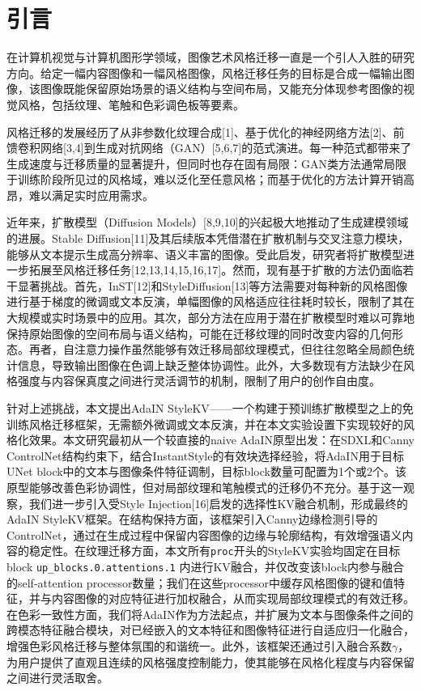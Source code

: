 \documentclass[10pt,twocolumn]{article}
\begin{document}
\section{引言}

在计算机视觉与计算机图形学领域，图像艺术风格迁移一直是一个引人入胜的研究方向。给定一幅内容图像和一幅风格图像，风格迁移任务的目标是合成一幅输出图像，该图像既能保留原始场景的语义结构与空间布局，又能充分体现参考图像的视觉风格，包括纹理、笔触和色彩调色板等要素。

风格迁移的发展经历了从非参数化纹理合成[1]、基于优化的神经网络方法[2]、前馈卷积网络[3,4]到生成对抗网络（GAN）[5,6,7]的范式演进。每一种范式都带来了生成速度与迁移质量的显著提升，但同时也存在固有局限：GAN类方法通常局限于训练阶段所见过的风格域，难以泛化至任意风格；而基于优化的方法计算开销高昂，难以满足实时应用需求。

近年来，扩散模型（Diffusion Models）[8,9,10]的兴起极大地推动了生成建模领域的进展。Stable Diffusion[11]及其后续版本凭借潜在扩散机制与交叉注意力模块，能够从文本提示生成高分辨率、语义丰富的图像。受此启发，研究者将扩散模型进一步拓展至风格迁移任务[12,13,14,15,16,17]。然而，现有基于扩散的方法仍面临若干显著挑战。首先，InST[12]和StyleDiffusion[13]等方法需要对每种新的风格图像进行基于梯度的微调或文本反演，单幅图像的风格适应往往耗时较长，限制了其在大规模或实时场景中的应用。其次，部分方法在应用于潜在扩散模型时难以可靠地保持原始图像的空间布局与语义结构，可能在迁移纹理的同时改变内容的几何形态。再者，自注意力操作虽然能够有效迁移局部纹理模式，但往往忽略全局颜色统计信息，导致输出图像在色调上缺乏整体协调性。此外，大多数现有方法缺少在风格强度与内容保真度之间进行灵活调节的机制，限制了用户的创作自由度。

针对上述挑战，本文提出AdaIN StyleKV——一个构建于预训练扩散模型之上的免训练风格迁移框架，无需额外微调或文本反演，并在本文实验设置下实现较好的风格化效果。本文研究最初从一个较直接的naive AdaIN原型出发：在SDXL和Canny ControlNet结构约束下，结合InstantStyle的有效块选择经验，将AdaIN用于目标UNet block中的文本与图像条件特征调制，目标block数量可配置为1个或2个。该原型能够改善色彩协调性，但对局部纹理和笔触模式的迁移仍不充分。基于这一观察，我们进一步引入受Style Injection[16]启发的选择性KV融合机制，形成最终的AdaIN StyleKV框架。在结构保持方面，该框架引入Canny边缘检测引导的ControlNet，通过在生成过程中保留内容图像的边缘与轮廓结构，有效增强语义内容的稳定性。在纹理迁移方面，本文所有\texttt{proc}开头的StyleKV实验均固定在目标block \texttt{up\_blocks.0.attentions.1} 内进行KV融合，并仅改变该block内参与融合的self-attention processor数量；我们在这些processor中缓存风格图像的键和值特征，并与内容图像的对应特征进行加权融合，从而实现局部纹理模式的有效迁移。在色彩一致性方面，我们将AdaIN作为方法起点，并扩展为文本与图像条件之间的跨模态特征融合模块，对已经嵌入的文本特征和图像特征进行自适应归一化融合，增强色彩风格迁移与整体氛围的和谐统一。此外，该框架还通过引入融合系数$\gamma$，为用户提供了直观且连续的风格强度控制能力，使其能够在风格化程度与内容保留之间进行灵活取舍。
\end{document}
